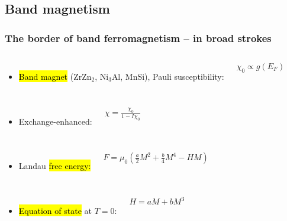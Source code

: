 \subsection{Band magnetism}
\begin{frame}[label=BorderFM1]
\frametitle{The border of band ferromagnetism -- in broad strokes}

\vspace{-2ex}
\begin{minipage}{\textwidth}
\begin{columns}[c]
\begin{itemize}
  \item
    \hl{Band magnet} (ZrZn$_2$, Ni$_3$Al, MnSi), Pauli susceptibility:
\end{itemize}
$\chi_0 \propto g(E_F)$
\end{columns}
\end{minipage}

\pause
\begin{minipage}{\textwidth}
\begin{columns}[b]
\begin{itemize}
  \item
    Exchange-enhanced:
\end{itemize}
$\chi=\frac{\chi_0}{1-I\chi_0} $
\end{columns}
\end{minipage}

\pause
\begin{minipage}{\textwidth}
\begin{columns}[b]
\begin{itemize}
  \item
    Landau \hl{free energy:} 
\end{itemize}
$ F=\mu_0\left(\frac{a}{2}M^2 + \frac{b}{4}M^4- H M
    \right) $
\end{columns}
\end{minipage}

\pause
\begin{minipage}{\textwidth}
\begin{columns}[b]
\begin{itemize}
  \item
    \hl{Equation of state} at $T=0$: 
\end{itemize}
$H=a M + b M^3 $
\end{columns}
\end{minipage}


\end{frame}
